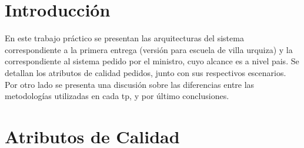 \documentclass[a4paper, 11pt]{article}
\begin{document}
\pagestyle{myheadings}
\maketitle

\thispagestyle{empty}
\tableofcontents

\newpage

\section{Introducci\'on}

En este trabajo práctico se presentan las arquitecturas del sistema correspondiente a la primera entrega (versión para escuela de villa urquiza) y la correspondiente al sistema pedido por el ministro, cuyo alcance es a nivel pais.
Se detallan los atributos de calidad pedidos, junto con sus respectivos escenarios. Por otro lado se presenta una discusión sobre las diferencias entre las metodologías utilizadas en cada tp, y por último conclusiones.
\newpage
\section{Atributos de Calidad}
\end{document}
